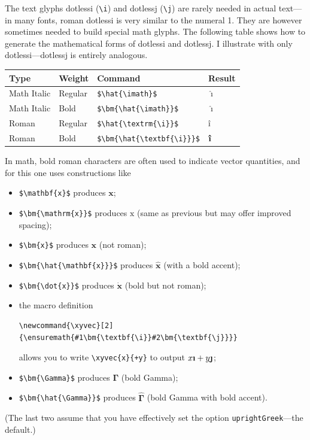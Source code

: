 \documentclass[11pt]{article}
\theoremstyle{oldplain}
\theoremstyle{plain}
\begin{document}
The text glyphs dotlessi (\verb|\i|) and dotlessj (\verb|\j|) are rarely needed in actual text---in many fonts, roman dotlessi is very similar to the numeral 1. They are however sometimes needed to build special math glyphs. The following table shows how to generate the mathematical forms of dotlessi and dotlessj. I illustrate with only dotlessi---dotlessj is entirely analogous.

\begin{center}
  \begin{tabular}{@{} llll @{}}
    \hline
    Type & Weight & Command & Result \\ 
    \hline
    Math Italic & Regular & \verb|$\hat{\imath}$| & $\hat{\imath}$ \\ 
    Math Italic & Bold & \verb|$\bm{\hat{\imath}}$| & $\bm{\hat{\imath}}$ \\ 
    Roman & Regular & \verb|$\hat{\textrm{\i}}$| & $\hat{\textrm{\i}}$\\ 
    Roman & Bold & \verb|$\bm{\hat{\textbf{\i}}}$| & $\bm{\hat{\textbf{\i}}}$\\ 
    \hline
  \end{tabular}
\end{center}
\newcommand{\xyvec}[2]{\ensuremath{#1\bm{\textbf{\i}}#2\bm{\textbf{\j}}}}

In math, bold roman characters are often used to indicate vector quantities, and for this one uses constructions like 
\begin{itemize}
\item
\verb|$\mathbf{x}$| produces $\mathbf{x}$;
\item
\verb|$\bm{\mathrm{x}}$| produces $\bm{\mathrm{x}}$ (same as previous but may offer improved spacing);
\item
\verb|$\bm{x}$| produces $\bm{x}$ (not roman);
\item
\verb|$\bm{\hat{\mathbf{x}}}$| produces $\bm{\hat{\mathbf{x}}}$ (with a bold accent);
\item \verb|$\bm{\dot{x}}$| produces $\bm{\dot{x}}$ (bold but not roman);
\item the macro definition
\begin{verbatim}
\newcommand{\xyvec}[2]{\ensuremath{#1\bm{\textbf{\i}}#2\bm{\textbf{\j}}}}
\end{verbatim}
allows you to write \verb|\xyvec{x}{+y}| to output $\xyvec{x}{+y}$;
\item \verb|$\bm{\Gamma}$| produces $\bm{\Gamma}$ (bold Gamma);
\item \verb|$\bm{\hat{\Gamma}}$| produces $\bm{\hat{\Gamma}}$ (bold Gamma with bold accent).
\end{itemize}
(The last two assume that you have effectively set the option {\tt uprightGreek}---the default.)
\end{document}
